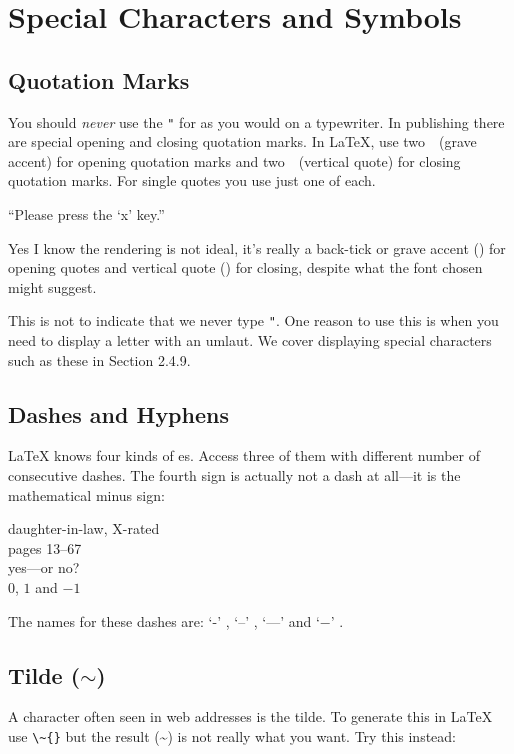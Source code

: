 \section{Special Characters and Symbols}

\subsection{Quotation Marks}

You should \emph{never} use the \verb|"| for 
 as you would on a typewriter.  In publishing
there are special opening and closing quotation marks.  In \LaTeX{},
use two~\textasciigrave~(grave accent) for opening quotation marks and
two~\textquotesingle~(vertical quote) for closing quotation marks. For single
quotes you use just one of each.
\begin{example}
``Please press the `x' key.''
\end{example}
Yes I know the rendering is not ideal, it's really a back-tick or grave accent
(\textasciigrave) for
opening quotes and vertical quote (\textquotesingle) for closing, despite what the font chosen might suggest.

This is not to indicate that we never type \verb|"|. One reason to use this is
when you need to display a letter with an umlaut. We cover displaying
special characters such as these in Section 2.4.9.
\subsection{Dashes and Hyphens}

\LaTeX{} knows four kinds of es. Access three of
them with different number of consecutive dashes. The fourth sign
is actually not a dash at all---it is the mathematical minus sign: \index{-}
\index{--} \index{---}  

\begin{example}
daughter-in-law, X-rated\\
pages 13--67\\
yes---or no? \\
$0$, $1$ and $-1$
\end{example}
The names for these dashes are:
`-' , `--' , `---'  and
`$-$' .

\subsection{Tilde ($\sim$)}
A character often seen in web addresses is the tilde. To generate
this in \LaTeX{} use \verb|\~{}| but the result (\~{}) is not really
what you want. Try this instead:


